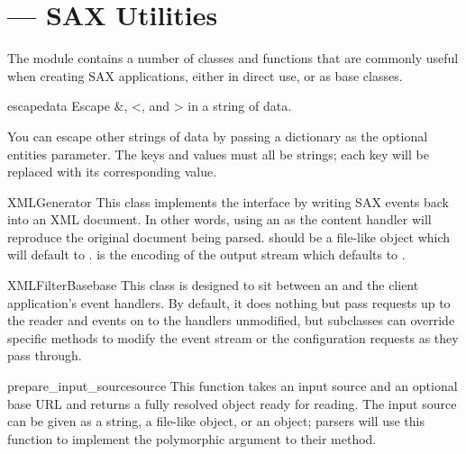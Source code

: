 \section{ ---
         SAX Utilities}




The module  contains a number of classes and
functions that are commonly useful when creating SAX applications,
either in direct use, or as base classes.

\begin{funcdesc}{escape}{data}
  Escape \&, <, and > in a string of data.

  You can escape other strings of data by passing a dictionary as the
  optional entities parameter.  The keys and values must all be
  strings; each key will be replaced with its corresponding value.
\end{funcdesc}

\begin{classdesc}{XMLGenerator}{}
  This class implements the  interface by
  writing SAX events back into an XML document. In other words, using
  an  as the content handler will reproduce the
  original document being parsed.  should be a file-like
  object which will default to .  is the
  encoding of the output stream which defaults to .
\end{classdesc}

\begin{classdesc}{XMLFilterBase}{base}
  This class is designed to sit between an  and the
  client application's event handlers.  By default, it does nothing
  but pass requests up to the reader and events on to the handlers
  unmodified, but subclasses can override specific methods to modify
  the event stream or the configuration requests as they pass through.
\end{classdesc}

\begin{funcdesc}{prepare_input_source}{source}
  This function takes an input source and an optional base URL and
  returns a fully resolved  object ready for
  reading.  The input source can be given as a string, a file-like
  object, or an  object; parsers will use this
  function to implement the polymorphic  argument to their
   method.
\end{funcdesc}
